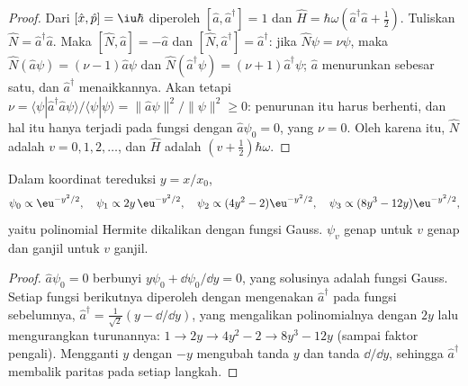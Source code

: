 \begin{proof}
Dari $[\hat x,\hat p] = \iu\hbar$ diperoleh $[\hat a,\hat a^\dagger] = 1$ dan
$\hat H = \hbar\omega(\hat a^\dagger\hat a + \frac12)$. Tuliskan $\hat N =
\hat a^\dagger\hat a$. Maka $[\hat N,\hat a] = -\hat a$ dan $[\hat N,\hat
a^\dagger] = \hat a^\dagger$: jika $\hat N\psi = \nu\psi$, maka $\hat N(\hat
a\psi) = (\nu - 1)\hat a\psi$ dan $\hat N(\hat a^\dagger\psi) = (\nu + 1)\hat
a^\dagger\psi$; $\hat a$ menurunkan  sebesar satu, dan
$\hat a^\dagger$ menaikkannya. Akan tetapi $\nu = \langle\psi|\hat a^\dagger\hat a\psi\rangle/\langle\psi|\psi
\rangle = \|\hat a\psi\|^2/\|\psi\|^2 \ge 0$: penurunan itu harus berhenti, dan
hal itu hanya terjadi pada fungsi dengan $\hat a\psi_0 = 0$, yang  $\nu = 0$. Oleh karena itu,  $\hat N$ adalah
$v = 0, 1, 2, \dots$, dan  $\hat H$ adalah
$(v + \frac12)\hbar\omega$.
\end{proof}

\begin{proposition}\label{prop:b3:quantum-model-systems:oscillator-functions}
Dalam koordinat tereduksi $y = x/x_0$,
\[
\psi_0 \propto \eu^{-y^2/2}, \quad \psi_1 \propto 2y\,\eu^{-y^2/2}, \quad
\psi_2 \propto (4y^2 - 2)\eu^{-y^2/2}, \quad \psi_3 \propto (8y^3 -
12y)\eu^{-y^2/2},
\]
yaitu polinomial Hermite dikalikan dengan fungsi Gauss. $\psi_v$ genap untuk
$v$ genap dan ganjil untuk $v$ ganjil.
\end{proposition}

\begin{proof}
$\hat a\psi_0 = 0$ berbunyi $y\psi_0 + \dd\psi_0/\dd y = 0$, yang solusinya
adalah fungsi Gauss. Setiap fungsi berikutnya diperoleh dengan mengenakan
$\hat a^\dagger$ pada fungsi sebelumnya, $\hat a^\dagger = \frac{1}{\sqrt2}(y - \dd/\dd y)$,
yang mengalikan polinomialnya dengan $2y$ lalu mengurangkan turunannya:
$1 \to 2y \to 4y^2 - 2 \to
8y^3 - 12y$ (sampai faktor pengali). Mengganti $y$
dengan $-y$ mengubah tanda $y$ dan tanda $\dd/\dd y$, sehingga
$\hat a^\dagger$ membalik paritas pada setiap langkah.
\end{proof}

